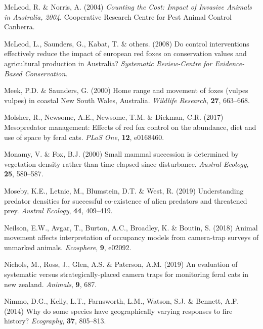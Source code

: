 \documentclass[]{elsarticle} %
\begin{document}
\leavevmode\hypertarget{ref-mcleod2004counting}{}%
McLeod, R. \& Norris, A. (2004) \emph{Counting the Cost: Impact of Invasive Animals in Australia, 2004}. Cooperative Research Centre for Pest Animal Control Canberra.

\leavevmode\hypertarget{ref-mcleod2008control}{}%
McLeod, L., Saunders, G., Kabat, T. \& others. (2008) Do control interventions effectively reduce the impact of european red foxes on conservation values and agricultural production in Australia? \emph{Systematic Review-Centre for Evidence-Based Conservation}.

\leavevmode\hypertarget{ref-meek2000home}{}%
Meek, P.D. \& Saunders, G. (2000) Home range and movement of foxes (vulpes vulpes) in coastal New South Wales, Australia. \emph{Wildlife Research}, \textbf{27}, 663--668.

\leavevmode\hypertarget{ref-molsher2017mesopredator}{}%
Molsher, R., Newsome, A.E., Newsome, T.M. \& Dickman, C.R. (2017) Mesopredator management: Effects of red fox control on the abundance, diet and use of space by feral cats. \emph{PLoS One}, \textbf{12}, e0168460.

\leavevmode\hypertarget{ref-monamy2000small}{}%
Monamy, V. \& Fox, B.J. (2000) Small mammal succession is determined by vegetation density rather than time elapsed since disturbance. \emph{Austral Ecology}, \textbf{25}, 580--587.

\leavevmode\hypertarget{ref-moseby2019understanding}{}%
Moseby, K.E., Letnic, M., Blumstein, D.T. \& West, R. (2019) Understanding predator densities for successful co-existence of alien predators and threatened prey. \emph{Austral Ecology}, \textbf{44}, 409--419.

\leavevmode\hypertarget{ref-neilson2018animal}{}%
Neilson, E.W., Avgar, T., Burton, A.C., Broadley, K. \& Boutin, S. (2018) Animal movement affects interpretation of occupancy models from camera-trap surveys of unmarked animals. \emph{Ecosphere}, \textbf{9}, e02092.

\leavevmode\hypertarget{ref-nichols2019evaluation}{}%
Nichols, M., Ross, J., Glen, A.S. \& Paterson, A.M. (2019) An evaluation of systematic versus strategically-placed camera traps for monitoring feral cats in new zealand. \emph{Animals}, \textbf{9}, 687.

\leavevmode\hypertarget{ref-nimmo2014why}{}%
Nimmo, D.G., Kelly, L.T., Farnsworth, L.M., Watson, S.J. \& Bennett, A.F. (2014) Why do some species have geographically varying responses to fire history? \emph{Ecography}, \textbf{37}, 805--813.
\end{document}
